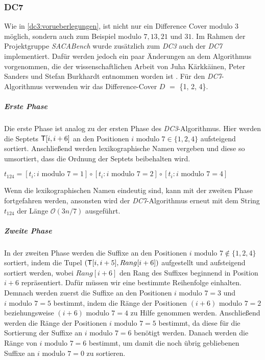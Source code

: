 \subsubsection{DC7}
\label{dc7}

Wie in \cref{dc3:vorueberlegungen}, ist nicht nur ein Difference Cover modulo $3$ möglich, sondern auch zum Beispiel modulo $7, 13, 21$ und $31$. Im Rahmen der Projektgruppe \emph{SACABench} wurde zusätzlich zum \emph{DC3} auch der \emph{DC7} implementiert. Dafür werden jedoch ein paar Änderungen an dem Algorithmus vorgenommen, die der wissenschaftlichen Arbeit von Juha Kärkkäinen, Peter Sanders und Stefan Burkhardt entnommen worden ist \cite{dc3:new}. Für den \emph{DC7}-Algorithmus verwenden wir das Difference-Cover \(D\) $=$ \{1, 2, 4\}.

\subparagraph*{Erste Phase}

Die erste Phase ist analog zu der ersten Phase des \emph{DC3}-Algorithmus. Hier werden die Septets $\inputtext[i,i+6]$ an den Positionen $i \text{ modulo } 7 \in \{1, 2, 4\}$ aufsteigend sortiert. Anschließend werden lexikographische Namen vergeben und diese so umsortiert, dass die Ordnung der Septets beibehalten wird.
\begin{center}
	$t_{124} = [t_i : i \text{ modulo } 7 = 1] \circ [t_i : i \text{ modulo } 7 = 2] \circ [t_i : i \text{ modulo } 7 = 4]$ 
\end{center}
Wenn die lexikographischen Namen eindeutig sind, kann mit der zweiten Phase fortgefahren werden, ansonsten wird der \emph{DC7}-Algorithmus erneut mit dem String $t_{124}$ der Länge $\mathcal{O}(3n/7)$ ausgeführt.

\subparagraph*{Zweite Phase}

In der zweiten Phase werden die Suffixe an den Positionen $i \text{ modulo } 7 \notin \{1, 2, 4\}$ sortiert, indem die Tupel $(\inputtext[i, i+5], Rang[i+6])$ aufgestellt und aufsteigend sortiert werden, wobei $Rang[i+6]$ den Rang des Suffixes beginnend in Position $i + 6$ repräsentiert. Dafür müssen wir eine bestimmte Reihenfolge einhalten. Demnach werden zuerst die Suffixe an den Positionen $i \text{ modulo } 7 = 3$ und $i \text{ modulo } 7 = 5$ bestimmt, indem die Ränge der Positionen $(i+6) \text{ modulo } 7 = 2$ beziehungsweise $(i+6) \text{ modulo } 7 = 4$ zu Hilfe genommen werden. Anschließend werden die Ränge der Positionen $i \text{ modulo } 7 = 5$ bestimmt, da diese für die Sortierung der Suffixe an $i \text{ modulo } 7 = 6$ benötigt werden. Danach werden die Ränge von $i \text{ modulo } 7 = 6$ bestimmt, um damit die noch übrig gebliebenen Suffixe an $i \text{ modulo } 7 = 0$ zu sortieren.

